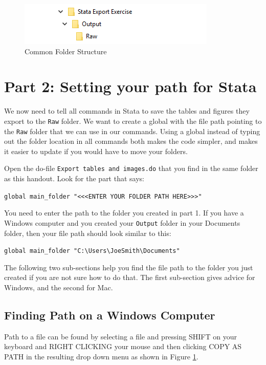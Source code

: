 \documentclass[]{article}
\begin{document}
\begin{figure}[H]
	\centering
	\includegraphics[width=0.6\linewidth]{img/outputRawFolders}
	\caption{Common Folder Structure}
	\label{fig:pathwin3}
\end{figure} 


\section*{Part 2: Setting your path for Stata}
We now need to tell all commands in Stata to save the tables and figures they export to the \texttt{Raw} folder. We want to create a global with the file path pointing to the \texttt{Raw} folder that we can use in our commands. Using a global instead of typing out the folder location in all commands both makes the code simpler, and makes it easier to update if you would have to move your folders.

Open the do-file \texttt{Export tables and images.do} that you find in the same folder as this handout. Look for the part that says:
\begin{center}
	\verb|global main_folder "<<<ENTER YOUR FOLDER PATH HERE>>>"|
\end{center}

You need to enter the path to the folder you created in part 1. If you have a Windows computer and you created your \texttt{Output} folder in your Documents folder, then your file path should look similar to this:
\begin{center}
	\verb|global main_folder "C:\Users\JoeSmith\Documents"|
\end{center}

The following two sub-sections help you find the file path to the folder you just created if you are not sure how to do that. The first sub-section gives advice for Windows, and the second for Mac.

\subsection*{Finding Path on a Windows Computer}

Path to a file can be found by selecting a file and pressing {\color{red}SHIFT on your keyboard and RIGHT CLICKING your mouse and then clicking COPY AS PATH in the resulting drop down menu} as shown in Figure \ref{fig:pathwin3}.
\end{document}

